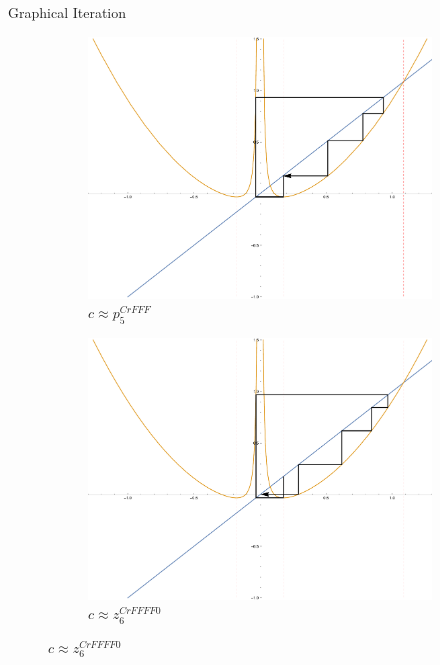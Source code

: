 \documentclass{beamer}
\newcommand{\<}{\left\langle}
\renewcommand{\>}{\right\rangle} %
\renewcommand{\*}{\cdot} %
\begin{document}
\begin{frame}[allowframebreaks]{Graphical Iteration}
\begin{figure}[ht]
		\begin{subfigure}[b]{.49\textwidth}
				\includegraphics[width=\textwidth]{./img/plot-009445}
				\caption{$c \approx p_5^{CrFFF}$}
		\end{subfigure}
		\begin{subfigure}[b]{.49\textwidth}
				\includegraphics[width=\textwidth]{./img/plot-009395}
				\caption{$c \approx z_6^{CrFFFF0}$}
		\end{subfigure}
		

\end{figure}
\end{frame}
\end{document}
